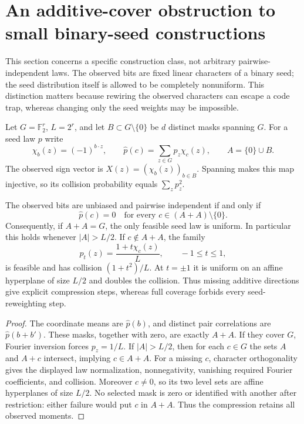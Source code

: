 \section{An additive-cover obstruction to small binary-seed constructions}
\label{sec:character-rigidity}
This section concerns a specific construction class, not arbitrary
pairwise-independent laws. The observed bits are fixed linear
characters of a binary seed; the seed distribution itself is allowed
to be completely nonuniform. This distinction matters because
rewiring the observed characters can escape a code trap, whereas
changing only the seed weights may be impossible.

Let $G=\mathbb F_2^r$, $L=2^r$, and let
$B\subset G\setminus\{0\}$ be $d$ distinct masks spanning $G$.
For a seed law $p$ write
\[
 \chi_b(z)=(-1)^{b\cdot z},\qquad
 \widehat p(c)=\sum_{z\in G}p_z\chi_c(z),\qquad
 A=\{0\}\cup B.
\]
The observed sign vector is $X(z)=(\chi_b(z))_{b\in B}$.
Spanning makes this map injective, so its collision probability equals
$\sum_zp_z^2$.

\begin{theorem}
\label{thm:character-cover}
The observed bits are unbiased and pairwise independent if and only if
\[
 \widehat p(c)=0\quad\text{for every }c\in(A+A)\setminus\{0\}.
\]
Consequently, if $A+A=G$, the only feasible seed law is uniform.
In particular this holds whenever $|A|>L/2$.
If $c\notin A+A$, the family
\[
 p_t(z)=\frac{1+t\chi_c(z)}L,\qquad -1\le t\le1,
\]
is feasible and has collision $(1+t^2)/L$. At $t=\pm1$ it is uniform
on an affine hyperplane of size $L/2$ and doubles the collision.
Thus missing additive directions give explicit compression steps,
whereas full coverage forbids every seed-reweighting step.
\end{theorem}
\begin{proof}
The coordinate means are $\widehat p(b)$, and distinct pair
correlations are $\widehat p(b+b')$. These masks, together with zero,
are exactly $A+A$. If they cover $G$, Fourier inversion forces
$p_z=1/L$. If $|A|>L/2$, then for each $c\in G$ the sets
$A$ and $A+c$ intersect, implying $c\in A+A$.
For a missing $c$, character orthogonality gives the displayed law
normalization, nonnegativity, vanishing required Fourier coefficients,
and collision. Moreover $c\ne0$, so its two level sets are affine
hyperplanes of size $L/2$. No selected mask is zero or identified
with another after restriction: either failure would put $c$ in
$A+A$. Thus the compression retains all observed moments.
\end{proof}

